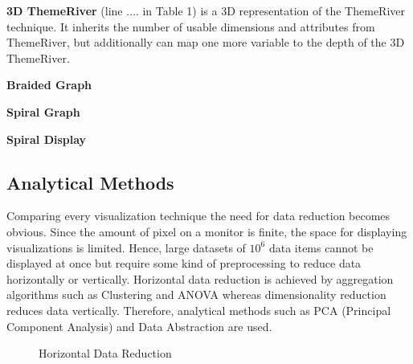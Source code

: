 \textbf{3D ThemeRiver} (line .... in Table 1) is a 3D representation of the ThemeRiver technique. It inherits the number of usable dimensions and attributes from ThemeRiver, but additionally can map one more variable to the depth of the 3D ThemeRiver.

\textbf{Braided Graph}

\textbf{Spiral Graph}

\cite{Weber2001}

\textbf{Spiral Display}
\cite{Carlis}

\subsection{Analytical Methods}
Comparing every visualization technique the need for data reduction becomes obvious. Since the amount of pixel on a monitor is finite, the space for displaying visualizations is limited. Hence, large datasets of $10^6$ data items cannot be displayed at once but require some kind of preprocessing\cite{FerreiradeOliveira2003,Aigner2011, Keim2005} to reduce data horizontally or vertically. 
Horizontal data reduction is achieved by aggregation algorithms such as Clustering and ANOVA whereas dimensionality reduction reduces data vertically. Therefore, analytical methods such as PCA (Principal Component Analysis) and Data Abstraction are used.
\begin{figure}[H]
    \centering
    \caption{Horizontal Data Reduction}
    \label{fig:my_label}
\end{figure}

